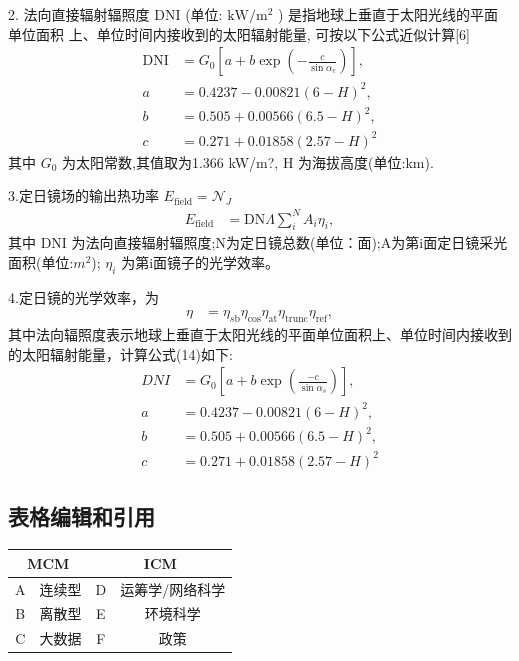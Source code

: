 \documentclass[a4paper,12pt]{article}
\begin{document}
    2. 法向直接辐射辐照度 DNI (单位: \(\mathrm{kW} / \mathrm{m}^{2}\) ) 是指地球上垂直于太阳光线的平面单位面积
    上、单位时间内接收到的太阳辐射能量, 可按以下公式近似计算[6]
    \begin{align}
    \mathrm{DNI} &= G_{0}\left[a + b \exp\left(-\frac{c}{\sin\alpha_{e}}\right)\right],\\ 
    a &= 0.4237 - 0.00821(6-H)^{2},\\ 
    b &= 0.505 + 0.00566(6.5 - H)^{2},\\ 
    c &= 0.271 + 0.01858(2.57 - H)^{2}
    \end{align}
    其中
    $G_{\mathrm{0}}$ 
    为太阳常数,其值取为1.366 kW/m?, H 为海拔高度(单位:km).

    3.定日镜场的输出热功率
    $E_{\mathrm{field}} = \mathcal{N}_{J}$ 
    \begin{align}
        E_{\mathrm{field}} &= \mathrm{DN}\Lambda\sum_{i}^{N}A_{i}\eta_{i},
    \end{align}
    其中 DNI 为法向直接辐射辐照度;N为定日镜总数(单位：面);A为第i面定日镜采光面积(单位:$m^{2}$);
    $\eta_{i}$ 为第i面镜子的光学效率。

    4.定日镜的光学效率，为
    \begin{align}
        \eta &= \eta_{s\mathrm{b}}\eta_{\mathrm{cos}}\eta_{\mathrm{at}}\eta_{\mathrm{trunc}}\eta_{\mathrm{ref}},
    \end{align}
    其中法向辐照度表示地球上垂直于太阳光线的平面单位面积上、单位时间内接收到的太阳辐射能量，计算公式(14)如下:
    \begin{equation}
        \begin{aligned}
        D N I &= G_{0}\left[a + b \exp\left(\frac{-c}{\sin \alpha_{s}}\right)\right], \\
        a &= 0.4237 - 0.00821(6 - H)^{2}, \\
        b &= 0.505 + 0.00566(6.5 - H)^{2}, \\
        c &= 0.271 + 0.01858(2.57 - H)^{2}
        \end{aligned}
        \tag{14}
    \end{equation}

\subsection{表格编辑和引用}
    \begin{tabular}{|c|c|c|c|}
        \hline
        \multicolumn{2}{|c|}{MCM} & \multicolumn{2}{|c|}{ICM} \\
        \hline
        A & 连续型 & D & 运筹学/网络科学\\
        \hline
        B & 离散型 & E & 环境科学\\
        \hline
        C & 大数据 & F & 政策\\
        \hline
    \end{tabular}
    
\end{document}
